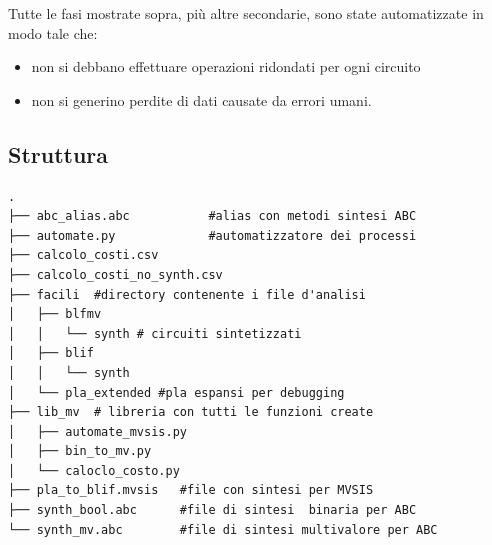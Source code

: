 \documentclass[
  italian,
]{book}
\providecommand{\tightlist}{%
  \setlength{\itemsep}{0pt}\setlength{\parskip}{0pt}}
\begin{document}
Tutte le fasi mostrate sopra, più altre secondarie, sono state automatizzate in modo tale che:

\begin{itemize}
\tightlist
\item
  non si debbano effettuare operazioni ridondati per ogni circuito
\item
  non si generino perdite di dati causate da errori umani.
\end{itemize}

\hypertarget{struttura}{%
\subsection{Struttura}\label{struttura}}

\begin{verbatim}
.
├── abc_alias.abc           #alias con metodi sintesi ABC
├── automate.py             #automatizzatore dei processi
├── calcolo_costi.csv
├── calcolo_costi_no_synth.csv
├── facili  #directory contenente i file d'analisi
│   ├── blfmv
│   │   └── synth # circuiti sintetizzati
│   ├── blif
│   │   └── synth
│   └── pla_extended #pla espansi per debugging
├── lib_mv  # libreria con tutti le funzioni create
│   ├── automate_mvsis.py
│   ├── bin_to_mv.py
│   └── caloclo_costo.py
├── pla_to_blif.mvsis   #file con sintesi per MVSIS
├── synth_bool.abc      #file di sintesi  binaria per ABC
└── synth_mv.abc        #file di sintesi multivalore per ABC
\end{verbatim}

\newpage
\end{document}
